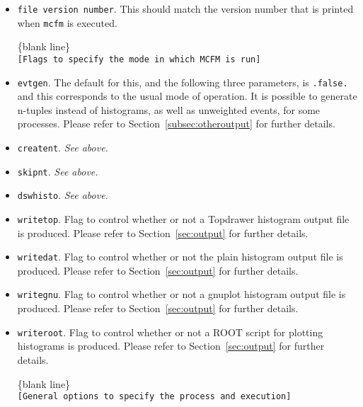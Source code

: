 \documentclass[12pt]{article}
\begin{document}
\begin{itemize}
\item {\tt file version number}. This should match the version number
that is printed when {\tt mcfm} is executed.

\begin{center}
\{blank line\} \\
{\tt [Flags to specify the mode in which MCFM is run] }
\end{center}

\item {\tt evtgen}. The default for this, and the following three
parameters, is {\tt .false.} and this corresponds to the usual mode
of operation. It is possible to generate n-tuples instead of histograms,
as well as unweighted events, for some processes. Please refer to
Section~\ref{subsec:otheroutput} for further details.
\item {\tt creatent}. {\it See above.}
\item {\tt skipnt}. {\it See above.}
\item {\tt dswhisto}. {\it See above.}
\item {\tt writetop}. Flag to control whether or not a Topdrawer histogram output file
is produced. Please refer to Section~\ref{sec:output} for further details.
\item {\tt writedat}. Flag to control whether or not the plain histogram output file
is produced. Please refer to Section~\ref{sec:output} for further details.
\item {\tt writegnu}. Flag to control whether or not a gnuplot histogram output file
is produced. Please refer to Section~\ref{sec:output} for further details.
\item {\tt writeroot}. Flag to control whether or not a ROOT script for plotting
histograms is produced. Please refer to Section~\ref{sec:output} for further details.

\begin{center}
\{blank line\} \\
{\tt [General options to specify the process and execution] }
\end{center}


\end{itemize}
\end{document}

